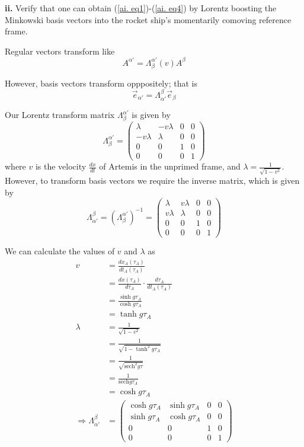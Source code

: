 \documentclass[a4paper]{article} %
\newcommand{\sech}{\text{sech}}
\newcommand{\pmx}[1]{\begin{pmatrix}#1\end{pmatrix}}
\begin{document}
\begin{framed}
\textbf{ii.} 
Verify that one can obtain (\ref{ai. eq1})-(\ref{ai. eq4}) by Lorentz boosting the Minkowski basis vectors into the rocket ship’s momentarily comoving reference frame.
\end{framed}

Regular vectors transform like
\begin{equation}
A^{\alpha'}=\Lambda^{\alpha'}_{\beta}(v)A^{\beta}
\end{equation}

However, basis vectors transform opppositely; that is
\begin{equation}
\vec{e}_{\alpha'}=\Lambda^{\beta}_{\alpha'}\vec{e}_{\beta}
\end{equation}

Our Lorentz transform matrix $\Lambda^{\alpha'}_{\beta}$ is given by
\begin{equation}
\Lambda^{\alpha'}_{\beta}=\pmx{\lambda&-v\lambda&0&0\\
-v\lambda&\lambda&0&0\\
0&0&1&0\\
0&0&0&1}
\end{equation}
where $v$ is the velocity $\frac{dx}{dt}$ of Artemis in the unprimed frame, and $\lambda=\frac{1}{\sqrt{1-v^2}}$. However, to transform basis vectors we require the inverse matrix, which is given by
\begin{equation}
\Lambda^{\beta}_{\alpha'}=\left(\Lambda^{\alpha'}_{\beta}\right)^{-1}=\pmx{\lambda&v\lambda&0&0\\
v\lambda&\lambda&0&0\\
0&0&1&0\\
0&0&0&1}
\end{equation}

We can calculate the values of $v$ and $\lambda$ as
\begin{align}
v&=\frac{dx_A(\tau_A)}{dt_A(\tau_A)}\\
&=\frac{dx(\tau_A)}{d\tau_A}\cdot\frac{d\tau_A}{dt_A(\tau_A)}\\
&=\frac{\sinh g\tau_A}{\cosh g\tau_A}\\
&=\tanh g\tau_A\\
\lambda&=\frac{1}{\sqrt{1-v^2}}\\
&=\frac{1}{\sqrt{1-\tanh^2 g\tau_A}}\\
&=\frac{1}{\sqrt{\sech^2 g\tau}}\\
&=\frac{1}{\sech g\tau_A}\\
&=\cosh g\tau_A\\
\Rightarrow \Lambda^{\beta}_{\alpha'}&=\pmx{\cosh g\tau_A&\sinh g\tau_A&0&0\\
\sinh g\tau_A &\cosh g\tau_A&0&0\\
0&0&1&0\\
0&0&0&1}
\end{align}
\end{document}
